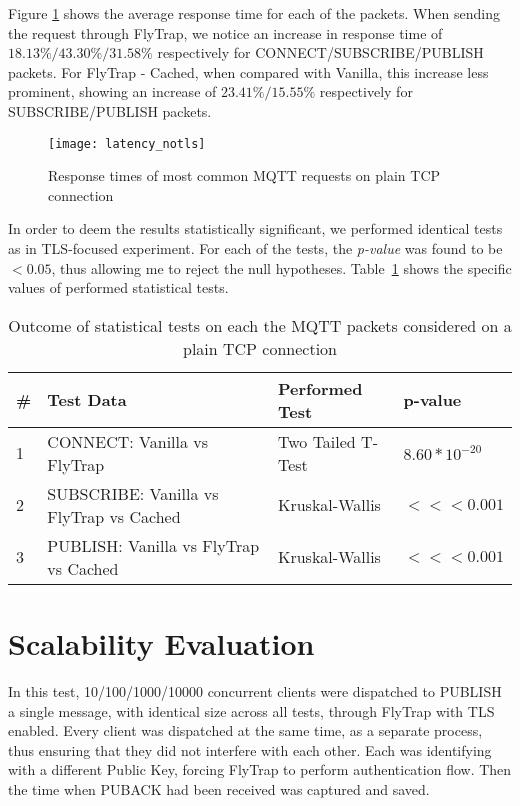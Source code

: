 Figure \ref{fig:latency_notls} shows the average response time for each of the packets. When sending the request through FlyTrap, we notice an increase in response time of $18.13\%/43.30\%/31.58\%$ respectively for CONNECT/SUBSCRIBE/PUBLISH packets. For FlyTrap - Cached, when compared with Vanilla, this increase less prominent, showing an increase of $23.41\%/15.55\%$ respectively for SUBSCRIBE/PUBLISH packets. 
\begin{figure}[h]
    \centering
    \texttt{[image: latency\_notls]}
    \caption{Response times of most common MQTT requests on plain TCP connection}
    \label{fig:latency_notls}
\end{figure}

In order to deem the results statistically significant, we performed identical tests as in TLS-focused experiment. For each of the tests, the \textit{p-value} was found to be $<0.05$, thus allowing me to reject the null hypotheses. Table\ \ref{tab:ttest-notls} shows the specific values of performed statistical tests.

\begin{table}[h]
\centering
\begin{tabular}{|l|l|l|l|}
\hline
\textbf{\#} & \textbf{Test Data}                       & \textbf{Performed Test} & \textbf{p-value}                      \\ \hline
1           & CONNECT: Vanilla vs FlyTrap              & Two Tailed T-Test       & $8.60*10^{-20}$                    \\ \hline
2           & SUBSCRIBE: Vanilla vs FlyTrap vs Cached & Kruskal-Wallis          & $<<< 0.001$ \\ \hline
3           & PUBLISH: Vanilla vs FlyTrap vs Cached & Kruskal-Wallis          & $<<< 0.001$ \\ \hline
\end{tabular}
\caption{Outcome of statistical tests on each the MQTT packets considered on a plain TCP connection}
\label{tab:ttest-notls}
\end{table}


\section{Scalability Evaluation}
In this test, 10/100/1000/10000 concurrent clients were dispatched to PUBLISH a single message, with identical size across all tests, through FlyTrap with TLS enabled. Every client was dispatched at the same time, as a separate process, thus ensuring that they did not interfere with each other. Each was identifying with a different Public Key, forcing FlyTrap to perform authentication flow. Then the time when PUBACK had been received was captured and saved.

